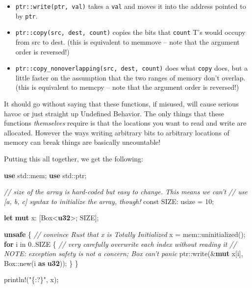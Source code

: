 \documentclass[a4paper,]{book}
\newenvironment{Shaded}{\begin{snugshade}}{\end{snugshade}}
\newcommand{\KeywordTok}[1]{\textcolor[rgb]{0.13,0.29,0.53}{\textbf{{#1}}}}
\newcommand{\DecValTok}[1]{\textcolor[rgb]{0.00,0.00,0.81}{{#1}}}
\newcommand{\StringTok}[1]{\textcolor[rgb]{0.31,0.60,0.02}{{#1}}}
\newcommand{\CommentTok}[1]{\textcolor[rgb]{0.56,0.35,0.01}{\textit{{#1}}}}
\newcommand{\OtherTok}[1]{\textcolor[rgb]{0.56,0.35,0.01}{{#1}}}
\newcommand{\NormalTok}[1]{{#1}}
\begin{document}
\begin{itemize}
\itemsep1pt\parskip0pt
\item
  \texttt{ptr::write(ptr,\ val)} takes a \texttt{val} and moves it into
  the address pointed to by \texttt{ptr}.
\item
  \texttt{ptr::copy(src,\ dest,\ count)} copies the bits that
  \texttt{count} T's would occupy from src to dest. (this is equivalent
  to memmove -- note that the argument order is reversed!)
\item
  \texttt{ptr::copy\_nonoverlapping(src,\ dest,\ count)} does what
  \texttt{copy} does, but a little faster on the assumption that the two
  ranges of memory don't overlap. (this is equivalent to memcpy -- note
  that the argument order is reversed!)
\end{itemize}

It should go without saying that these functions, if misused, will cause
serious havoc or just straight up Undefined Behavior. The only things
that these functions \emph{themselves} require is that the locations you
want to read and write are allocated. However the ways writing arbitrary
bits to arbitrary locations of memory can break things are basically
uncountable!

Putting this all together, we get the following:

\begin{Shaded}
\begin{Highlighting}[]
\KeywordTok{use} \NormalTok{std::mem;}
\KeywordTok{use} \NormalTok{std::ptr;}

\CommentTok{// size of the array is hard-coded but easy to change. This means we can't}
\CommentTok{// use [a, b, c] syntax to initialize the array, though!}
\NormalTok{const SIZE: usize = }\DecValTok{10}\NormalTok{;}

\KeywordTok{let} \KeywordTok{mut} \NormalTok{x: [Box<}\KeywordTok{u32}\NormalTok{>; SIZE];}

\KeywordTok{unsafe} \NormalTok{\{}
    \CommentTok{// convince Rust that x is Totally Initialized}
    \NormalTok{x = mem::uninitialized();}
    \KeywordTok{for} \NormalTok{i in }\DecValTok{0.}\NormalTok{.SIZE \{}
        \CommentTok{// very carefully overwrite each index without reading it}
        \CommentTok{// NOTE: exception safety is not a concern; Box can't panic}
        \NormalTok{ptr::write(&}\KeywordTok{mut} \NormalTok{x[i], Box::new(i }\KeywordTok{as} \KeywordTok{u32}\NormalTok{));}
    \NormalTok{\}}
\NormalTok{\}}

\OtherTok{println!}\NormalTok{(}\StringTok{"\{:?\}"}\NormalTok{, x);}
\end{Highlighting}
\end{Shaded}
\end{document}
